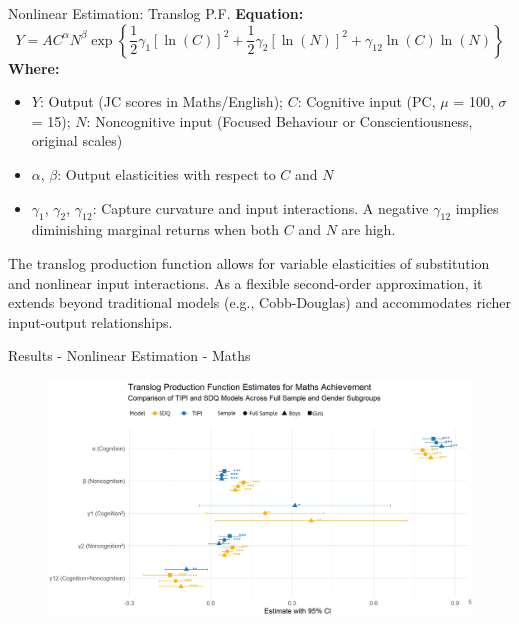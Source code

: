 \documentclass{beamer}
\begin{document}
    

\begin{frame}{Nonlinear Estimation: Translog P.F.}
\textbf{Equation:}
\begin{equation*}
Y = A C^{\alpha} N^{\beta} \exp\left\{ \frac{1}{2} \gamma_{1} \left[\ln(C)\right]^2 + \frac{1}{2} \gamma_{2} \left[\ln(N)\right]^2 + \gamma_{12} \ln(C) \ln(N) \right\}
\end{equation*}
\small
\textbf{Where:}
\begin{itemize}
    \item $Y$: Output (JC scores in Maths/English); $C$: Cognitive input (PC, $\mu$ = 100, $\sigma$ = 15); $N$: Noncognitive input (Focused Behaviour or Conscientiousness, original scales)
    \item $\alpha$, $\beta$: Output elasticities with respect to $C$ and $N$
    \item $\gamma_1$, $\gamma_2$, $\gamma_{12}$: Capture curvature and input interactions. A negative $\gamma_{12}$ implies diminishing marginal returns when both $C$ and $N$ are high.
\end{itemize}

The translog production function allows for variable elasticities of substitution and nonlinear input interactions. As a flexible second-order approximation, it extends beyond traditional models (e.g., Cobb-Douglas) and accommodates richer input-output relationships.
\end{frame}



\begin{frame}{Results - Nonlinear Estimation - Maths}

\begin{figure}[h!]
    \centering
    \includegraphics[width=1\linewidth]{Maths_Translog_Results.JPG}
    \label{fig:your_labelz}
\end{figure}
    \end{frame}
\end{document}
